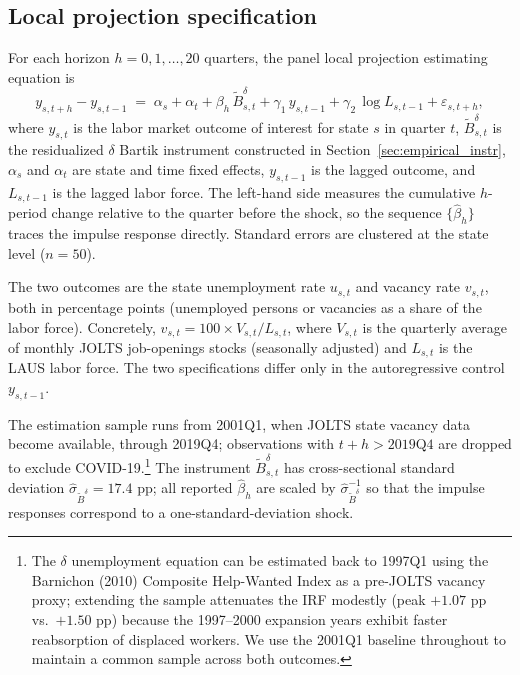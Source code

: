 \documentclass[authoryear, review, 12pt]{elsarticle}
\begin{document}
	\subsection{Local projection specification}\label{sec:empirical_lp}

	For each horizon $h=0,1,\ldots,20$ quarters, the panel local projection
	estimating equation is
	\begin{equation}\label{eq:lp}
		y_{s,t+h} - y_{s,t-1}
		\;=\;
		\alpha_s + \alpha_t
		+ \beta_h\,\tilde{B}^{\delta}_{s,t}
		+ \gamma_1\,y_{s,t-1}
		+ \gamma_2\,\log L_{s,t-1}
		+ \varepsilon_{s,t+h},
	\end{equation}
	where $y_{s,t}$ is the labor market outcome of interest for state $s$ in quarter $t$,
	$\tilde{B}^{\delta}_{s,t}$ is the residualized $\delta$ Bartik instrument
	constructed in Section~\ref{sec:empirical_instr}, $\alpha_s$ and
	$\alpha_t$ are state and time fixed effects, $y_{s,t-1}$ is the lagged
	outcome, and $L_{s,t-1}$ is the lagged labor force.  The left-hand side
	measures the cumulative $h$-period change relative to the quarter before
	the shock, so the sequence $\{\hat\beta_h\}$ traces the impulse response
	directly.  Standard errors are clustered at the state level ($n=50$).

	The two outcomes are the state unemployment rate $u_{s,t}$ and vacancy
	rate $v_{s,t}$, both in percentage points (unemployed persons or
	vacancies as a share of the labor force).  Concretely,
	$v_{s,t} = 100 \times V_{s,t}/L_{s,t}$, where $V_{s,t}$ is the
	quarterly average of monthly JOLTS job-openings stocks (seasonally
	adjusted) and $L_{s,t}$ is the LAUS labor force.  The two
	specifications differ only in the autoregressive control $y_{s,t-1}$.

	The estimation sample runs from 2001Q1, when JOLTS state vacancy data
	become available, through 2019Q4; observations with $t+h >
	\text{2019Q4}$ are dropped to exclude COVID-19.\footnote{The $\delta$
		unemployment equation can be estimated back to 1997Q1 using the
		Barnichon (2010) Composite Help-Wanted Index as a pre-JOLTS vacancy
		proxy; extending the sample attenuates the IRF modestly (peak
		$+1.07$ pp vs.\ $+1.50$ pp) because the 1997--2000 expansion years
		exhibit faster reabsorption of displaced workers.  We use the 2001Q1
		baseline throughout to maintain a common sample across both outcomes.}
	The instrument $\tilde{B}^{\delta}_{s,t}$ has cross-sectional standard
	deviation $\hat\sigma_{\tilde{B}^\delta} = 17.4$ pp; all reported
	$\hat\beta_h$ are scaled by $\hat\sigma_{\tilde{B}^\delta}^{-1}$ so
	that the impulse responses correspond to a one-standard-deviation shock.
\end{document}
